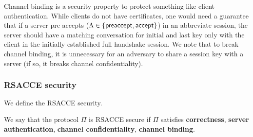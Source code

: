 \begin{remark}
Channel binding is a security property to protect something like client authentication.
While clients do not have certificates, one would need a guarantee that if a server
pre-accepts ($\Lambda \in \{\mathsf{preaccept}, \mathsf{accept} \}$)
in an abbreviate session, the server should have a matching conversation for initial and
last key only with the client
in the initially established full handshake session.
We note that to break channel binding, it is unnecessary for an adversary to share a session key with a server
(if so, it breaks channel confidentiality).
\end{remark}

\subsubsection{RSACCE security}
We define the RSACCE security.

\begin{definition}
 We say that the protocol $\Pi$ is RSACCE secure
 if $\Pi$ satisfies \textbf{correctness},
 \textbf{server authentication},
 \textbf{channel confidentiality}, \textbf{channel binding}.
\end{definition}